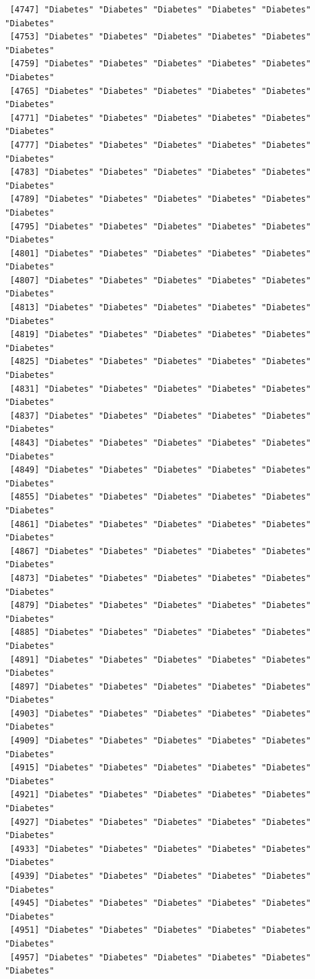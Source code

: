 \documentclass[
  letterpaper,
  DIV=11,
  numbers=noendperiod]{scrartcl}
\begin{document}
\begin{verbatim}
 [4747] "Diabetes" "Diabetes" "Diabetes" "Diabetes" "Diabetes" "Diabetes"
 [4753] "Diabetes" "Diabetes" "Diabetes" "Diabetes" "Diabetes" "Diabetes"
 [4759] "Diabetes" "Diabetes" "Diabetes" "Diabetes" "Diabetes" "Diabetes"
 [4765] "Diabetes" "Diabetes" "Diabetes" "Diabetes" "Diabetes" "Diabetes"
 [4771] "Diabetes" "Diabetes" "Diabetes" "Diabetes" "Diabetes" "Diabetes"
 [4777] "Diabetes" "Diabetes" "Diabetes" "Diabetes" "Diabetes" "Diabetes"
 [4783] "Diabetes" "Diabetes" "Diabetes" "Diabetes" "Diabetes" "Diabetes"
 [4789] "Diabetes" "Diabetes" "Diabetes" "Diabetes" "Diabetes" "Diabetes"
 [4795] "Diabetes" "Diabetes" "Diabetes" "Diabetes" "Diabetes" "Diabetes"
 [4801] "Diabetes" "Diabetes" "Diabetes" "Diabetes" "Diabetes" "Diabetes"
 [4807] "Diabetes" "Diabetes" "Diabetes" "Diabetes" "Diabetes" "Diabetes"
 [4813] "Diabetes" "Diabetes" "Diabetes" "Diabetes" "Diabetes" "Diabetes"
 [4819] "Diabetes" "Diabetes" "Diabetes" "Diabetes" "Diabetes" "Diabetes"
 [4825] "Diabetes" "Diabetes" "Diabetes" "Diabetes" "Diabetes" "Diabetes"
 [4831] "Diabetes" "Diabetes" "Diabetes" "Diabetes" "Diabetes" "Diabetes"
 [4837] "Diabetes" "Diabetes" "Diabetes" "Diabetes" "Diabetes" "Diabetes"
 [4843] "Diabetes" "Diabetes" "Diabetes" "Diabetes" "Diabetes" "Diabetes"
 [4849] "Diabetes" "Diabetes" "Diabetes" "Diabetes" "Diabetes" "Diabetes"
 [4855] "Diabetes" "Diabetes" "Diabetes" "Diabetes" "Diabetes" "Diabetes"
 [4861] "Diabetes" "Diabetes" "Diabetes" "Diabetes" "Diabetes" "Diabetes"
 [4867] "Diabetes" "Diabetes" "Diabetes" "Diabetes" "Diabetes" "Diabetes"
 [4873] "Diabetes" "Diabetes" "Diabetes" "Diabetes" "Diabetes" "Diabetes"
 [4879] "Diabetes" "Diabetes" "Diabetes" "Diabetes" "Diabetes" "Diabetes"
 [4885] "Diabetes" "Diabetes" "Diabetes" "Diabetes" "Diabetes" "Diabetes"
 [4891] "Diabetes" "Diabetes" "Diabetes" "Diabetes" "Diabetes" "Diabetes"
 [4897] "Diabetes" "Diabetes" "Diabetes" "Diabetes" "Diabetes" "Diabetes"
 [4903] "Diabetes" "Diabetes" "Diabetes" "Diabetes" "Diabetes" "Diabetes"
 [4909] "Diabetes" "Diabetes" "Diabetes" "Diabetes" "Diabetes" "Diabetes"
 [4915] "Diabetes" "Diabetes" "Diabetes" "Diabetes" "Diabetes" "Diabetes"
 [4921] "Diabetes" "Diabetes" "Diabetes" "Diabetes" "Diabetes" "Diabetes"
 [4927] "Diabetes" "Diabetes" "Diabetes" "Diabetes" "Diabetes" "Diabetes"
 [4933] "Diabetes" "Diabetes" "Diabetes" "Diabetes" "Diabetes" "Diabetes"
 [4939] "Diabetes" "Diabetes" "Diabetes" "Diabetes" "Diabetes" "Diabetes"
 [4945] "Diabetes" "Diabetes" "Diabetes" "Diabetes" "Diabetes" "Diabetes"
 [4951] "Diabetes" "Diabetes" "Diabetes" "Diabetes" "Diabetes" "Diabetes"
 [4957] "Diabetes" "Diabetes" "Diabetes" "Diabetes" "Diabetes" "Diabetes"

\end{verbatim}
\end{document}
